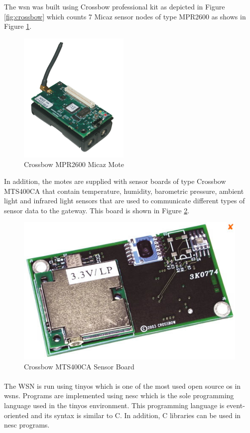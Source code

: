 \documentclass[12pt,a4paper,final]{report}
\begin{document}
The \gls{wsn} was built using Crossbow professional kit as depicted in Figure \ref{fig:crossbow} which counts 7 Micaz sensor nodes of type MPR2600 as shows in Figure \ref{fig:micaz}.
\begin{figure}[htbp]
\centering
\includegraphics[scale=0.8]{img/micaz.png}
\caption{Crossbow MPR2600 Micaz Mote}
\label{fig:micaz}
\end{figure}

In addition, the motes are supplied with sensor boards of type Crossbow MTS400CA that contain temperature, humidity, barometric pressure, ambient light and infrared light sensors that are used to communicate different types of sensor data to the gateway. This board is shown in Figure \ref{fig:mts400}.

\begin{figure}[htbp]
\centering
\includegraphics[scale=0.5]{img/mts400ca.jpg}
\caption{Crossbow MTS400CA Sensor Board}
\label{fig:mts400}
\end{figure}
\paragraph{}
The WSN is run using \gls{tinyos} which is one of the most used open source \gls{os} in \glspl{wsn}. Programs are implemented using \gls{nesc} which is the sole programming language used in the \gls{tinyos} environment. This programming language is event-oriented and its syntax is similar to C. In addition, C libraries can be used in \gls{nesc} programs.
\end{document}
